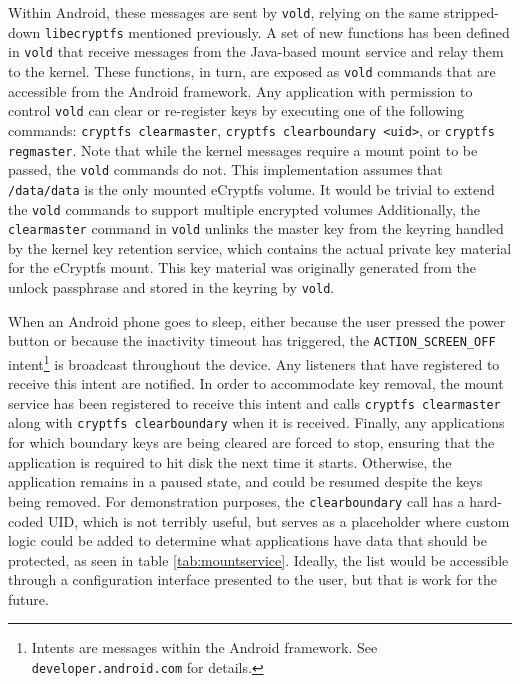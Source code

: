 Within Android, these messages are sent by \texttt{vold}, relying on the same stripped-down \texttt{libecryptfs} mentioned
previously.  A set of new functions has been defined in \texttt{vold} that receive messages from the Java-based mount service and
relay them to the kernel. These functions, in turn, are exposed as \texttt{vold} commands that are accessible from the Android
framework. Any application with permission to control \texttt{vold} can clear or re-register keys by executing one of the following
commands: \texttt{cryptfs clearmaster}, \texttt{cryptfs clearboundary <uid>}, or \texttt{cryptfs regmaster}. Note that while the
kernel messages require a mount point to be passed, the \texttt{vold} commands do not. This implementation assumes that
\texttt{/data/data} is the only mounted eCryptfs volume. It would be trivial to extend the \texttt{vold} commands to support
multiple encrypted volumes Additionally, the \texttt{clearmaster} command in \texttt{vold} unlinks the master key from the keyring
handled by the kernel key retention service, which contains the actual private key material for the eCryptfs mount. This key
material was originally generated from the unlock passphrase and stored in the keyring by \texttt{vold}.

When an Android phone goes to sleep, either because the user pressed the power button or because the inactivity timeout has
triggered, the \texttt{ACTION\_SCREEN\_OFF} intent\footnote{Intents are messages within the Android framework. See
\texttt{developer.android.com} for details.} is broadcast throughout the device. Any listeners that have registered to receive this
intent are notified. In order to accommodate key removal, the mount service has been registered to receive this intent and calls
\texttt{cryptfs clearmaster} along with \texttt{cryptfs clearboundary} when it is received. Finally, any applications for which
boundary keys are being cleared are forced to stop, ensuring that the application is required to hit disk the next time it starts.
Otherwise, the application remains in a paused state, and could be resumed despite the keys being removed. For demonstration
purposes, the \texttt{clearboundary} call has a hard-coded UID, which is not terribly useful, but serves as a placeholder where
custom logic could be added to determine what applications have data that should be protected, as seen in table
\ref{tab:mountservice}. Ideally, the list would be accessible through a configuration interface presented to the user, but that is
work for the future. 


